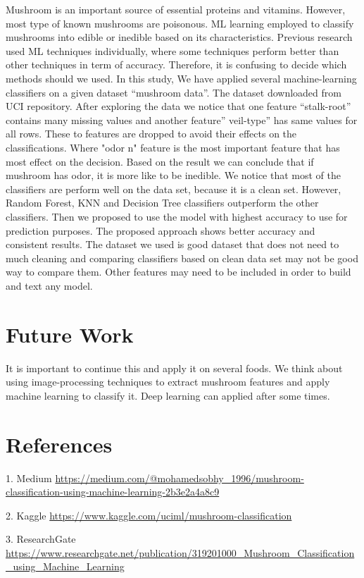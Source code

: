 \documentclass[a4paper,11pt]{article}
\begin{document}
            Mushroom is an important source of essential proteins and vitamins. However, most type of known mushrooms are poisonous. ML learning employed to classify mushrooms into edible or inedible based on its characteristics.  Previous research used ML techniques individually, where some techniques perform better than other techniques in term of accuracy. Therefore, it is confusing to decide which methods should we used.  In this study, We have applied several machine-learning classifiers on a given dataset “mushroom data”. The dataset downloaded from UCI repository. After exploring the data we notice that one feature “stalk-root” contains many missing values and another feature” veil-type” has same values for all rows. These to features are dropped to avoid their effects on the classifications. Where "odor n" feature is the most important feature that has most effect on the decision. Based on the result we can conclude that if mushroom has odor, it is more like to be inedible.   We notice that most of the classifiers are perform well on the data set, because it is a clean set. However, Random Forest, KNN and Decision Tree classifiers outperform the other classifiers. Then we proposed to use the model with highest accuracy to use for prediction purposes.  The proposed approach shows better accuracy and consistent results.   The dataset we used is good dataset that does not need to much cleaning and comparing classifiers based on clean data set may not be good way to compare them. Other features may need to be included in order to build and text any model. 

        \section{Future Work}

            It is important to continue this and apply it on several foods. We think about using image-processing techniques to extract mushroom features and apply machine learning to classify it. Deep learning can applied after some times.

        \section{References}

            1. Medium \url{https://medium.com/@mohamedsobhy_1996/mushroom-classification-using-machine-learning-2b3e2a4a8c9}


            2. Kaggle \url{https://www.kaggle.com/uciml/mushroom-classification}

            
            3. ResearchGate \url{https://www.researchgate.net/publication/319201000_Mushroom_Classification_using_Machine_Learning}




        
\end{document}
